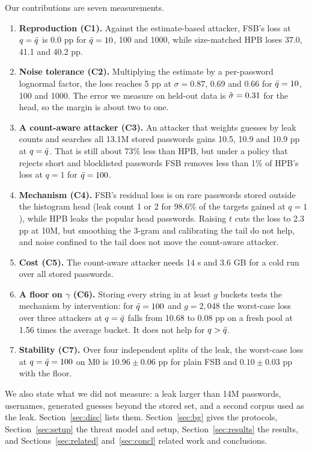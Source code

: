 Our contributions are seven measurements.

\begin{enumerate}
\item \textbf{Reproduction (C1).} Against the estimate-based attacker, FSB's loss at $q=\bar q$ is 0.0 pp for $\bar q=10$, 100 and 1000, while size-matched HPB loses 37.0, 41.1 and 40.2 pp.
\item \textbf{Noise tolerance (C2).} Multiplying the estimate by a per-password lognormal factor, the loss reaches 5 pp at $\sigma=0.87$, 0.69 and 0.66 for $\bar q=10$, 100 and 1000. The error we measure on held-out data is $\hat\sigma=0.31$ for the head, so the margin is about two to one.
\item \textbf{A count-aware attacker (C3).} An attacker that weights guesses by leak counts and searches all 13.1M stored passwords gains 10.5, 10.9 and 10.9 pp at $q=\bar q$. That is still about 73\% less than HPB, but under a policy that rejects short and blocklisted passwords FSB removes less than 1\% of HPB's loss at $q=1$ for $\bar q=100$.
\item \textbf{Mechanism (C4).} FSB's residual loss is on rare passwords stored outside the histogram head (leak count 1 or 2 for 98.6\% of the targets gained at $q=1$), while HPB leaks the popular head passwords. Raising $t$ cuts the loss to 2.3 pp at 10M, but smoothing the 3-gram and calibrating the tail do not help, and noise confined to the tail does not move the count-aware attacker.
\item \textbf{Cost (C5).} The count-aware attacker needs 14 s and 3.6 GB for a cold run over all stored passwords.
\item \textbf{A floor on $\gamma$ (C6).} Storing every string in at least $g$ buckets tests the mechanism by intervention: for $\bar q=100$ and $g=2{,}048$ the worst-case loss over three attackers at $q=\bar q$ falls from 10.68 to 0.08 pp on a fresh pool at 1.56 times the average bucket. It does not help for $q>\bar q$.
\item \textbf{Stability (C7).} Over four independent splits of the leak, the worst-case loss at $q=\bar q=100$ on M0 is $10.96\pm0.06$ pp for plain FSB and $0.10\pm0.03$ pp with the floor.
\end{enumerate}

We also state what we did not measure: a leak larger than 14M passwords, usernames, generated guesses beyond the stored set, and a second corpus used as the leak. Section~\ref{sec:disc} lists them. Section~\ref{sec:bg} gives the protocols, Section~\ref{sec:setup} the threat model and setup, Section~\ref{sec:results} the results, and Sections~\ref{sec:related} and~\ref{sec:concl} related work and conclusions.

